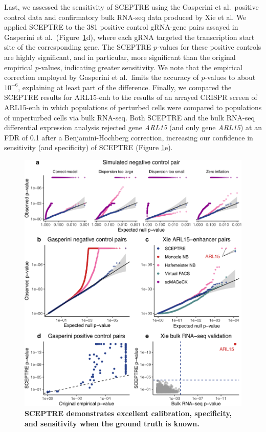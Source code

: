 \documentclass{nature}
\begin{document}
Last, we assessed the sensitivity of SCEPTRE using the Gasperini et al.\ positive control data and confirmatory bulk RNA-seq data produced by Xie et al. We applied SCEPTRE to the 381 positive control gRNA-gene pairs assayed in Gasperini et al.\ (Figure~\ref{fig:ground_truth}d), where each gRNA targeted the transcription start site of the corresponding gene. The SCEPTRE $p$-values for these positive controls are highly significant, and in particular, more significant than the original empirical $p$-values, indicating greater sensitivity. We note that the empirical correction employed by Gasperini et al.\ limits the accuracy of $p$-values to about $10^{-6}$, explaining at least part of the difference. Finally, we compared the SCEPTRE results for ARL15-enh to the results of an arrayed CRISPR screen of ARL15-enh in which populations of perturbed cells were compared to populations of unperturbed cells via bulk RNA-seq.\cite{Xie2019} Both SCEPTRE and the bulk RNA-seq differential expression analysis rejected gene \textit{ARL15} (and only gene \textit{ARL15}) at an FDR of 0.1 after a Benjamini-Hochberg correction, increasing our confidence in sensitivity (and specificity) of SCEPTRE (Figure \ref{fig:ground_truth}e).

\newpage
\begin{figure}[h!]
	\includegraphics[width = \textwidth]{figures/Figure3/Figure3_cropped.pdf}
	\caption{\textbf{SCEPTRE demonstrates excellent calibration, specificity, and sensitivity when the ground truth is known.}}
	\label{fig:ground_truth}
 \end{figure}
\clearpage
\end{document}
